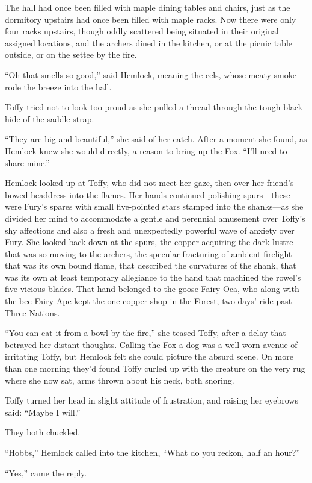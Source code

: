 \documentclass[11pt,a5paper]{article}
\begin{document}
The hall had once been filled with maple dining tables and chairs, just as the dormitory upstairs had once been filled with maple racks. Now there were only four racks upstairs, though oddly scattered being situated in their original assigned locations, and the archers dined in the kitchen, or at the picnic table outside, or on the settee by the fire.

``Oh that smells so good,'' said Hemlock, meaning the eels, whose meaty smoke rode the breeze into the hall.

Toffy tried not to look too proud as she pulled a thread through the tough black hide of the saddle strap.

``They are big and beautiful,'' she said of her catch. After a moment she found, as Hemlock knew she would directly, a reason to bring up the Fox. ``I'll need to share mine.''

Hemlock looked up at Toffy, who did not meet her gaze, then over her friend's bowed headdress into the flames. Her hands continued polishing spurs---these were Fury's spares with small five-pointed stars stamped into the shanks---as she divided her mind to accommodate a gentle and perennial amusement over Toffy's shy affections and also a fresh and unexpectedly powerful wave of anxiety over Fury. She looked back down at the spurs, the copper acquiring the dark lustre that was so moving to the archers, the specular fracturing of ambient firelight that was its own bound flame, that described the curvatures of the shank, that was its own at least temporary allegiance to the hand that machined the rowel's five vicious blades. That hand belonged to the goose-Fairy Oca, who along with the bee-Fairy Ape kept the one copper shop in the Forest, two days' ride past Three Nations.

``You can eat it from a bowl by the fire,'' she teased Toffy, after a delay that betrayed her distant thoughts. Calling the Fox a dog was a well-worn avenue of irritating Toffy, but Hemlock felt she could picture the absurd scene. On more than one morning they'd found Toffy curled up with the creature on the very rug where she now sat, arms thrown about his neck, both snoring.

Toffy turned her head in slight attitude of frustration, and raising her eyebrows said: ``Maybe I will.''

They both chuckled.

``Hobbs,'' Hemlock called into the kitchen, ``What do you reckon, half an hour?''

``Yes,'' came the reply.
\end{document}
